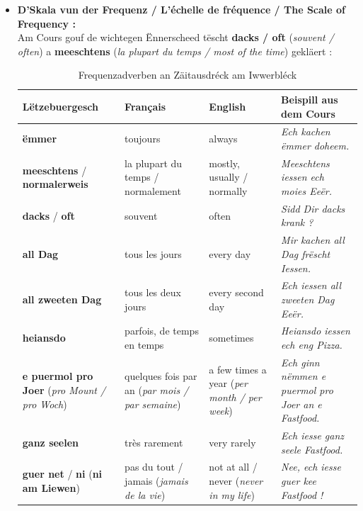 \begin{itemize}
    \item \textbf{D'Skala vun der Frequenz / L'échelle de fréquence / The Scale of Frequency :} \\
    Am Cours gouf de wichtegen Ënnerscheed tëscht \textbf{dacks / oft} (\textit{souvent / often}) a \textbf{meeschtens} (\textit{la plupart du temps / most of the time}) gekläert :
    \begin{table}[htbp]
        \centering
        \begin{tabular}{p{3.8cm}p{3.6cm}p{3.2cm}p{4.6cm}}
            \toprule
            \textbf{Lëtzebuergesch} & \textbf{Français} & \textbf{English} & \textbf{Beispill aus dem Cours} \\
            \midrule
            \textbf{ëmmer} & toujours & always & \textit{Ech kachen ëmmer doheem.} \\
            \midrule
            \textbf{meeschtens} / \textbf{normalerweis} & la plupart du temps / normalement & mostly, usually / normally & \textit{Meeschtens iessen ech moies Eeër.} \\
            \midrule
            \textbf{dacks} / \textbf{oft} & souvent & often & \textit{Sidd Dir dacks krank ?} \\
            \midrule
            \textbf{all Dag} & tous les jours & every day & \textit{Mir kachen all Dag frëscht Iessen.} \\
            \midrule
            \textbf{all zweeten Dag} & tous les deux jours & every second day & \textit{Ech iessen all zweeten Dag Eeër.} \\
            \midrule
            \textbf{heiansdo} & parfois, de temps en temps & sometimes & \textit{Heiansdo iessen ech eng Pizza.} \\
            \midrule
            \textbf{e puermol pro Joer} \newline (\textit{pro Mount / pro Woch}) & quelques fois par an \newline (\textit{par mois / par semaine}) & a few times a year \newline (\textit{per month / per week}) & \textit{Ech ginn nëmmen e puermol pro Joer an e Fastfood.} \\
            \midrule
            \textbf{ganz seelen} & très rarement & very rarely & \textit{Ech iesse ganz seele Fastfood.} \\
            \midrule
            \textbf{guer net} / \textbf{ni} (\textbf{ni am Liewen}) & pas du tout / jamais (\textit{jamais de la vie}) & not at all / never (\textit{never in my life}) & \textit{Nee, ech iesse guer kee Fastfood !} \\
            \bottomrule
        \end{tabular}
        \caption{Frequenzadverben an Zäitausdréck am Iwwerbléck}
    \end{table}


\end{itemize}
